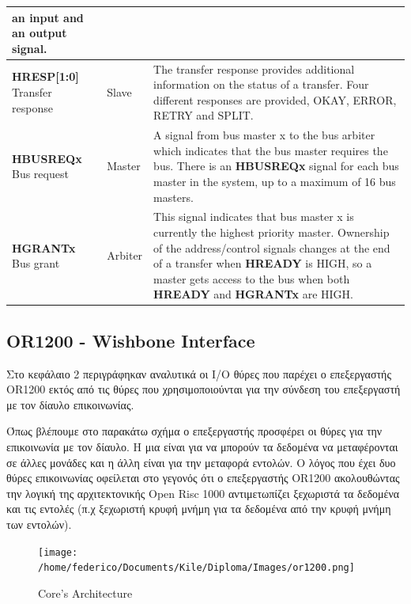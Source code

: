 \documentclass[a4paper,10pt]{article}
\numberwithin{figure}{section}
\numberwithin{table}{section}
\begin{document}
\begin{center}
\begin{longtable}{p{1.5 cm} l p{6 cm}}
an input and an output signal.\\\hline
{\bf HRESP[1:0]}
Transfer response & Slave & The transfer response provides additional
information on the status of a transfer.
Four different responses are provided, OKAY,
ERROR, RETRY and SPLIT.\\\hline
{\bf HBUSREQx}
Bus request & Master & A signal from bus master x to the bus arbiter which
indicates that the bus master requires the bus. There is an
{\bf HBUSREQx} signal for each bus master in the system, up to
a maximum of 16 bus masters.\\\hline
{\bf HGRANTx}
Bus grant & Arbiter & This signal indicates that bus master x is currently the
highest priority master. Ownership of the address/control
signals changes at the end of a transfer when {\bf HREADY} is
HIGH, so a master gets access to the bus when both
{\bf HREADY} and {\bf HGRANTx} are HIGH.\\\hline
\end{longtable}
\end{center}

\newpage
\subsection{OR1200 - Wishbone Interface}

Στο κεφάλαιο 2 περιγράφηκαν αναλυτικά οι I/O θύρες που παρέχει ο επεξεργαστής OR1200 εκτός από τις θύρες που χρησιμοποιούνται για την σύνδεση του επεξεργαστή με τον δίαυλο επικοινωνίας. 
\newline

Όπως βλέπουμε στο παρακάτω σχήμα ο επεξεργαστής προσφέρει οι θύρες για την επικοινωνία με τον δίαυλο. Η μια είναι για να μπορούν τα δεδομένα να μεταφέρονται σε άλλες μονάδες και η άλλη είναι για την μεταφορά εντολών. Ο λόγος που έχει δυο θύρες επικοινωνίας οφείλεται στο γεγονός ότι ο επεξεργαστής OR1200 ακολουθώντας την λογική της αρχιτεκτονικής Open Risc 1000 αντιμετωπίζει ξεχωριστά τα δεδομένα και τις εντολές (π.χ ξεχωριστή κρυφή μνήμη για τα δεδομένα από την κρυφή μνήμη των εντολών).

\vspace{0.7cm}
\begin{figure}[h!]
 \centering
 \texttt{[image: /home/federico/Documents/Kile/Diploma/Images/or1200.png]}
 \caption{Core's Architecture}
\end{figure}
\vspace{0.7cm}
\end{document}
